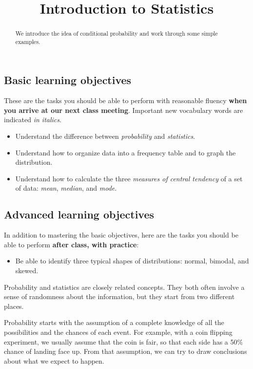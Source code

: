 \documentclass{ximera}
\title{Introduction to Statistics}
\begin{document}
\begin{abstract}
We introduce the idea of conditional probability and work through some simple examples.
\end{abstract}
\maketitle

\subsection*{Basic learning objectives}

These are the tasks you should be able to perform with reasonable fluency \textbf{when you arrive at our next class meeting}. Important new vocabulary words are indicated \emph{in italics}. 

\begin{itemize}
    \item Understand the difference between \emph{probability} and \emph{statistics}.
    \item Understand how to organize data into a frequency table and to graph the distribution.
	\item Understand how to calculate the three \emph{measures of central tendency} of a set of data: \emph{mean}, \emph{median}, and \emph{mode}.
\end{itemize}

\subsection*{Advanced learning objectives}

In addition to mastering the basic objectives, here are the tasks you should be able to perform \textbf{after class, with practice}: 

\begin{itemize}
    \item Be able to identify three typical shapes of distributions: normal, bimodal, and skewed.
\end{itemize}

\noindent\hrulefill

Probability and statistics are closely related concepts. They both often involve a sense of randomness about the information, but they start from two different places.

Probability starts with the assumption of a complete knowledge of all the possibilities and the chances of each event. For example, with a coin flipping experiment, we usually assume that the coin is fair, so that each side has a 50\% chance of landing face up. From that assumption, we can try to draw conclusions about what we expect to happen.
\end{document}
